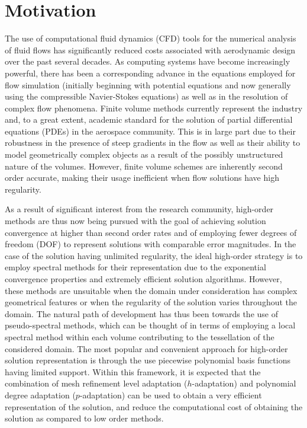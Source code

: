 \section{Motivation}
\label{sec:intro_motivation}

The use of computational fluid dynamics (CFD) tools for the numerical analysis
of fluid flows has significantly reduced costs associated with aerodynamic
design over the past several decades.
As computing systems have become
increasingly powerful, there has been a corresponding advance in the equations
employed for flow simulation (initially beginning with potential equations and
now generally using the compressible Navier-Stokes equations) as well as in the resolution of
complex flow phenomena.
Finite volume methods currently represent the industry
and, to a great extent, academic standard for the solution of partial
differential equations (PDEs) in the aerospace community.
This is in large part
due to their robustness in the presence of steep gradients in the flow as well
as their ability to model geometrically complex objects as a result of the
possibly unstructured nature of the volumes.
However, finite volume schemes are
inherently second order accurate, making their usage inefficient when flow
solutions have high regularity.

As a result of significant interest from the research community, high-order
methods are thus now being pursued with the goal of achieving solution
convergence at higher than second order rates and of employing fewer degrees of
freedom (DOF) to represent solutions with comparable error magnitudes.
In the case of the solution having unlimited regularity, the ideal high-order
strategy is to employ spectral methods for their representation due to the
exponential convergence properties and extremely efficient solution algorithms.
However, these methods are unsuitable when the domain under consideration has
complex geometrical features or when the regularity of the solution varies
throughout the domain.
The natural path of development has thus been towards the use of
pseudo-spectral methods, which can be thought of in terms of employing a local
spectral method within each volume contributing to the tessellation of the
considered domain.
The most popular and convenient approach for high-order
solution representation is through the use piecewise polynomial basis functions
having limited support.
Within this framework, it is expected that the
combination of mesh refinement level adaptation ($h$-adaptation) and polynomial
degree adaptation ($p$-adaptation) can be used to obtain a very efficient
representation of the solution, and reduce the computational cost of obtaining
the solution as compared to low order methods.

